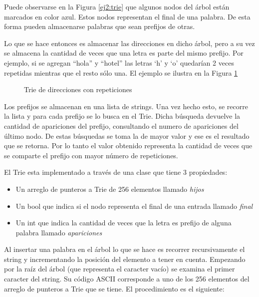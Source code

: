 Puede observarse en la Figura \ref{ej2:trie} que algunos nodos del árbol están
marcados en color azul. Estos nodos representan el final de una palabra. De
esta forma pueden almacenarse palabras que sean prefijos de otras.

Lo que se hace entonces es almacenar las direcciones en dicho árbol, pero a
su vez se almacena la cantidad de veces que una letra es parte del mismo
prefijo. Por ejemplo, si se agregan ``hola'' y ``hotel'' las letras `h' y `o'
quedarían 2 veces repetidas mientras que el resto sólo una. El ejemplo se
ilustra en la Figura \ref{ej2:trie_rep}

\begin{figure}[ht]
	\caption{Trie de direcciones con repeticiones}
	\label{ej2:trie_rep}
	\centering
\end{figure}

Los prefijos se almacenan en una lista de strings. Una vez hecho esto, se
recorre la lista y para cada prefijo se lo busca en el Trie. Dicha búsqueda
devuelve la cantidad de apariciones del prefijo, consultando el numero de
apariciones del último nodo. De estas búsquedas se toma la de mayor valor y
ese es el resultado que se retorna. Por lo tanto el valor obtenido representa
la cantidad de veces que se comparte el prefijo con mayor número de
repeticiones.

El Trie esta implementado a través de una clase que tiene 3 propiedades:

\begin{itemize}
\item Un arreglo de punteros a Trie de 256 elementos llamado \textit{hijos}
\item Un bool que indica si el nodo representa el final de una entrada llamado
\textit{final}
\item Un int que indica la cantidad de veces que la letra es prefijo de alguna
palabra llamado \textit{apariciones}
\end{itemize}

Al insertar una palabra en el árbol lo que se hace es recorrer recursivamente
el string y incrementando la posición del elemento a tener en cuenta.
Empezando por la raíz del árbol (que representa el caracter vacío) se examina
el primer caracter del string. Su código ASCII corresponde a uno de los 256
elementos del arreglo de punteros a Trie que se tiene. El procedimiento es el
siguiente:

